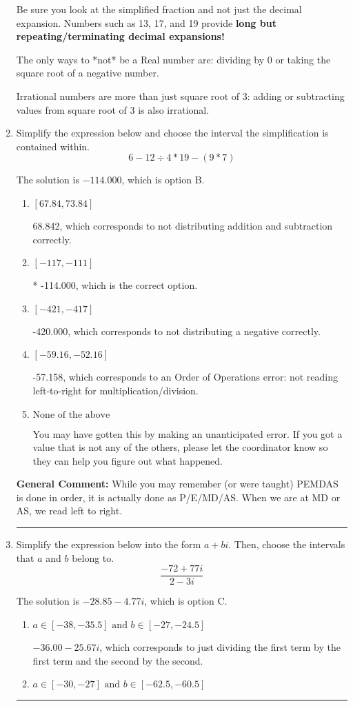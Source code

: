\documentclass{extbook}[14pt]
\newcommand{\litem}[1]{\item #1

\rule{\textwidth}{0.4pt}}
\begin{document}
\begin{enumerate}
{ Be sure you look at the simplified fraction and not just the decimal expansion. Numbers such as 13, 17, and 19 provide \textbf{long but repeating/terminating decimal expansions!} 
 
 The only ways to *not* be a Real number are: dividing by 0 or taking the square root of a negative number. 
 
 Irrational numbers are more than just square root of 3: adding or subtracting values from square root of 3 is also irrational.
}
\litem{
Simplify the expression below and choose the interval the simplification is contained within.
\[ 6 - 12 \div 4 * 19 - (9 * 7) \]

The solution is \( -114.000 \), which is option B.\begin{enumerate}[label=\Alph*.]
\item \( [67.84, 73.84] \)

 68.842, which corresponds to not distributing addition and subtraction correctly.
\item \( [-117, -111] \)

* -114.000, which is the correct option.
\item \( [-421, -417] \)

 -420.000, which corresponds to not distributing a negative correctly.
\item \( [-59.16, -52.16] \)

 -57.158, which corresponds to an Order of Operations error: not reading left-to-right for multiplication/division.
\item \( \text{None of the above} \)

 You may have gotten this by making an unanticipated error. If you got a value that is not any of the others, please let the coordinator know so they can help you figure out what happened.
\end{enumerate}

\textbf{General Comment:} While you may remember (or were taught) PEMDAS is done in order, it is actually done as P/E/MD/AS. When we are at MD or AS, we read left to right.
}
\litem{
Simplify the expression below into the form $a+bi$. Then, choose the intervals that $a$ and $b$ belong to.
\[ \frac{-72 + 77 i}{2 - 3 i} \]

The solution is \( -28.85  - 4.77 i \), which is option C.\begin{enumerate}[label=\Alph*.]
\item \( a \in [-38, -35.5] \text{ and } b \in [-27, -24.5] \)

 $-36.00  - 25.67 i$, which corresponds to just dividing the first term by the first term and the second by the second.
\item \( a \in [-30, -27] \text{ and } b \in [-62.5, -60.5] \)


\end{enumerate}}
\end{enumerate}
\end{document}
